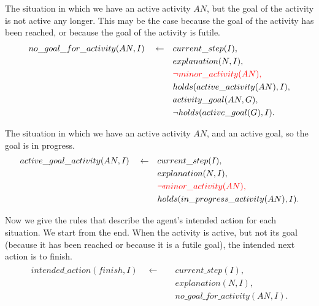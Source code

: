 \documentclass[11pt, oneside]{article}
\begin{document}
The situation in which  we have an active activity $AN$, but the goal of the activity is not active any longer. This may be the case because the goal of the activity has been reached, or because  the goal of the activity is futile. \begin{align}\begin{split}
no\_goal\_for\_activity(AN,I)\quad \leftarrow \quad &current\_step(I),\\
&explanation(N,I),\\
&\textcolor{red}{\neg minor\_activity(AN),}\\
&holds(active\_activity(AN),I),\\
&activity\_goal(AN,G),\\
&\neg holds(active\_goal(G),I).
\end{split}\end{align}

The situation in which we have an active activity $AN$, and an active goal, so the goal is in progress.
\begin{align}\begin{split}
active\_goal\_activity(AN,I)\quad \leftarrow \quad &current\_step(I),\\
&explanation(N,I),\\
&\textcolor{red}{\neg minor\_activity(AN),}\\
&holds(in\_progress\_activity(AN),I).
\end{split}\end{align}


Now we give the rules that describe the agent's intended action for each situation. We start from the end. When the activity is active, but not its goal (because it has been reached or because it is a futile goal), the intended next action is to finish.
\begin{align}\begin{split}
intended\_action(finish,I)\quad \leftarrow \quad &current\_step(I),\\
&explanation(N,I),\\
&no\_goal\_for\_activity(AN,I).
\end{split}\end{align}
\end{document}
